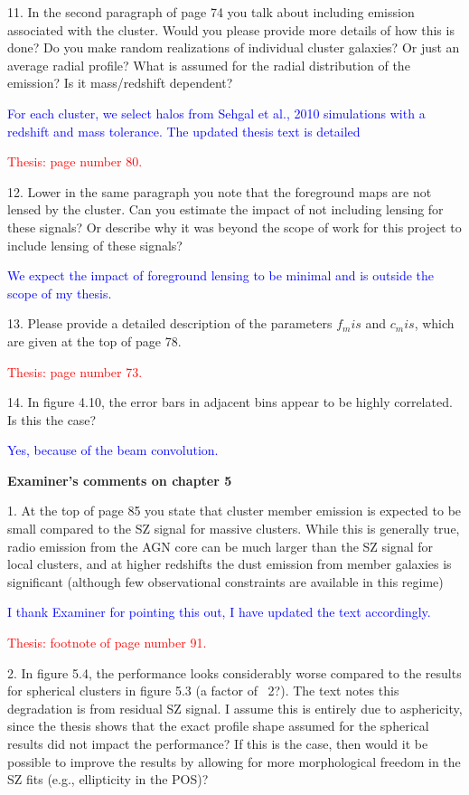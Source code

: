 \documentclass[11pt,a4paper]{article}
\begin{document}
11. In the second paragraph of page 74 you talk about including emission associated
with the cluster. Would you please provide more details of how this is done? Do
you make random realizations of individual cluster galaxies? Or just an average
radial profile? What is assumed for the radial distribution of the emission? Is it
mass/redshift dependent?

\textcolor{blue}{For each cluster, we select halos from Sehgal et al., 2010 simulations with a redshift and mass tolerance. The updated thesis text is detailed}

\textcolor{red}{Thesis: page number 80.}

12. Lower in the same paragraph you note that the foreground maps are not lensed
by the cluster. Can you estimate the impact of not including lensing for these
signals? Or describe why it was beyond the scope of work for this project to
include lensing of these signals?

\textcolor{blue}{We expect the impact of foreground lensing to be minimal and is outside the scope of my thesis.}

13. Please provide a detailed description of the parameters $f_mis$ and $c_mis$, which
are given at the top of page 78.

\textcolor{red}{Thesis: page number 73.}

14. In figure 4.10, the error bars in adjacent bins appear to be highly correlated. Is
this the case?

\textcolor{blue}{Yes, because of the beam convolution.}

\begin{center}
\textbf{Examiner's comments on chapter 5}
\end{center}


1. At the top of page 85 you state that cluster member emission is expected to be
small compared to the SZ signal for massive clusters. While this is generally true,
radio emission from the AGN core can be much larger than the SZ signal for local
clusters, and at higher redshifts the dust emission from member galaxies is
significant (although few observational constraints are available in this regime)

\textcolor{blue}{I thank Examiner for pointing this out, I have updated the text accordingly. }

\textcolor{red}{Thesis: footnote of page number 91.}

2. In figure 5.4, the performance looks considerably worse compared to the results
for spherical clusters in figure 5.3 (a factor of ~2?). The text notes this
degradation is from residual SZ signal. I assume this is entirely due to
asphericity, since the thesis shows that the exact profile shape assumed for the
spherical results did not impact the performance? If this is the case, then would it
be possible to improve the results by allowing for more morphological freedom in
the SZ fits (e.g., ellipticity in the POS)?
\end{document}
